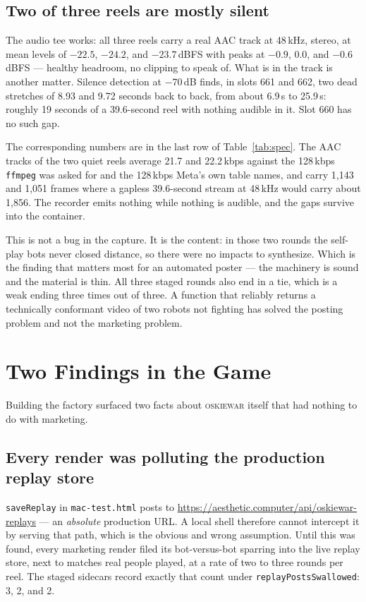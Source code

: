 \documentclass[10pt,letterpaper,twocolumn]{article}
\newcommand{\game}{\textsc{oskiewar}}
\newcommand{\code}[1]{\texttt{#1}}
\begin{document}
\subsection{Two of three reels are mostly silent}

The audio tee works: all three reels carry a real AAC track at 48\,kHz, stereo,
at mean levels of $-22.5$, $-24.2$, and $-23.7$\,dBFS with peaks at $-0.9$,
$0.0$, and $-0.6$\,dBFS --- healthy headroom, no clipping to speak of. What is
in the track is another matter. Silence detection at $-70$\,dB finds, in slots
661 and 662, two dead stretches of 8.93 and 9.72 seconds back to back, from
about 6.9\,s to 25.9\,s: roughly 19 seconds of a 39.6-second reel with nothing
audible in it. Slot 660 has no such gap.

The corresponding numbers are in the last row of Table~\ref{tab:spec}. The AAC
tracks of the two quiet reels average 21.7 and 22.2\,kbps against the 128\,kbps
\code{ffmpeg} was asked for and the 128\,kbps Meta's own table names, and carry
1,143 and 1,051 frames where a gapless 39.6-second stream at 48\,kHz would carry
about 1,856. The recorder emits nothing while nothing is audible, and the gaps
survive into the container.

This is not a bug in the capture. It is the content: in those two rounds the
self-play bots never closed distance, so there were no impacts to synthesize.
Which is the finding that matters most for an automated poster --- the machinery
is sound and the material is thin. All three staged rounds also end in a tie,
which is a weak ending three times out of three. A function that reliably
returns a technically conformant video of two robots not fighting has solved the
posting problem and not the marketing problem.

\section{Two Findings in the Game}
\label{sec:bugs}

Building the factory surfaced two facts about \game{} itself that had nothing to
do with marketing.

\subsection{Every render was polluting the production replay store}

\code{saveReplay} in \code{mac-test.html} posts to
\url{https://aesthetic.computer/api/oskiewar-replays} --- an \emph{absolute}
production URL. A local shell therefore cannot intercept it by serving that
path, which is the obvious and wrong assumption. Until this was found, every
marketing render filed its bot-versus-bot sparring into the live replay store,
next to matches real people played, at a rate of two to three rounds per reel.
The staged sidecars record exactly that count under
\code{replayPostsSwallowed}: 3, 2, and 2.
\end{document}
